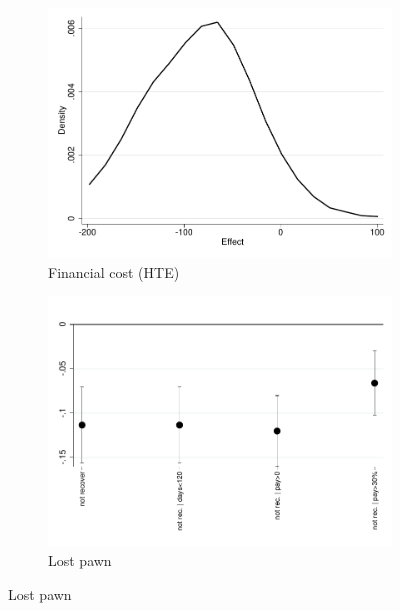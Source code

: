 \documentclass[11pt]{article}
\begin{document}
\begin{figure}[H]
\begin{center}
        \bigskip
        \bigskip
    
    \begin{subfigure}{0.45\textwidth}
        \caption{Financial cost (HTE)}
        \centering
        \includegraphics[width=\textwidth]{Figuras/he_dist_fc_admin_disc_pro_2.pdf}
    \end{subfigure}
    \begin{subfigure}{0.45\textwidth}
        \caption{Lost pawn}
        \centering
        \includegraphics[width=\textwidth]{Figuras/def_te_pro_2.pdf}
    \end{subfigure}


\end{center}
\end{figure}
\end{document}
